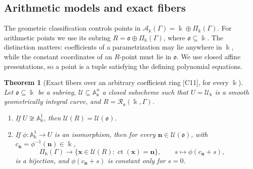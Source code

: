 \documentclass[11pt,oneside]{article}
\numberwithin{equation}{section}
\newtheorem{theorem}{Theorem}[section]
\theoremstyle{definition}
\theoremstyle{remark}
\newcommand{\ct}{\operatorname{ct}}
\newcommand{\src}[1]{\textup{\textsf{\small[#1]}}}
\newcommand{\crA}{\mathcal A_\Bbbk(\Gamma)}
\newcommand{\crP}{\Pi_\Bbbk(\Gamma)}
\newcommand{\Aff}{\mathbb A}
\begin{document}
\subsection{Arithmetic models and exact fibers}\label{odg:cr:sub:arith}

The geometric classification controls points in $\crA=\Bbbk\oplus\crP$.
For arithmetic points we use its subring $R=\mathfrak o\oplus\crP$, where
$\mathfrak o\subseteq\Bbbk$. The distinction matters: coefficients of a
parametrization may lie anywhere in $\Bbbk$, while the constant coordinates
of an $R$-point must lie in $\mathfrak o$. We use closed affine presentations,
so a point is a tuple satisfying the defining polynomial equations.

\begin{theorem}[Exact fibers over an arbitrary coefficient ring \src{C11}, for every $\Bbbk$]\label{odg:cr:thm:arith}
Let $\mathfrak o\subseteq\Bbbk$ be a subring, $\mathcal U\subseteq\Aff^n_{\mathfrak o}$
a closed subscheme such that $U=\mathcal U_\Bbbk$ is a smooth
geometrically integral curve, and $R=\mathcal R_{\mathfrak o}(\Bbbk,\Gamma)$.
\begin{enumerate}[label=\textup{(\roman*)},leftmargin=*]
\item If $U\not\cong\Aff^1_\Bbbk$, then $\mathcal U(R)=\mathcal U(\mathfrak o)$.
\item If $\phi:\Aff^1_\Bbbk\to U$ is an isomorphism, then for every
$\mathbf n\in\mathcal U(\mathfrak o)$, with $c_{\mathbf n}=\phi^{-1}(\mathbf n)\in\Bbbk$,
\[
 \crP\longrightarrow\{\mathbf x\in\mathcal U(R):\ct(\mathbf x)=\mathbf n\},\qquad
 s\longmapsto\phi(c_{\mathbf n}+s),
\]
is a bijection, and $\phi(c_{\mathbf n}+s)$ is constant only for $s=0$.
\end{enumerate}
\end{theorem}
\end{document}
